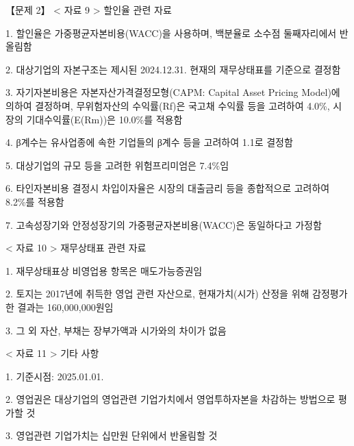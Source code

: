 \begin{longquestion}{【문제 2】}
< 자료 9 > 할인율 관련 자료 \par
1. 할인율은 가중평균자본비용(WACC)을 사용하며, 백분율로 소수점 둘째자리에서 반올림함 \par
2. 대상기업의 자본구조는 제시된 2024.12.31. 현재의 재무상태표를 기준으로 결정함 \par
3. 자기자본비용은 자본자산가격결정모형(CAPM: Capital Asset Pricing Model)에 의하여 결정하며, 무위험자산의 수익률(Rf)은 국고채 수익률 등을 고려하여 4.0\%, 시장의 기대수익률(E(Rm))은 10.0\%를 적용함 \par
4. β계수는 유사업종에 속한 기업들의 β계수 등을 고려하여 1.1로 결정함 \par
5. 대상기업의 규모 등을 고려한 위험프리미엄은 7.4\%임 \par
6. 타인자본비용 결정시 차입이자율은 시장의 대출금리 등을 종합적으로 고려하여 8.2\%를 적용함 \par
7. 고속성장기와 안정성장기의 가중평균자본비용(WACC)은 동일하다고 가정함 \par
< 자료 10 > 재무상태표 관련 자료 \par
1. 재무상태표상 비영업용 항목은 매도가능증권임 \par
2. 토지는 2017년에 취득한 영업 관련 자산으로, 현재가치(시가) 산정을 위해 감정평가한 결과는 160,000,000원임 \par
3. 그 외 자산, 부채는 장부가액과 시가와의 차이가 없음 \par
< 자료 11 > 기타 사항 \par
1. 기준시점: 2025.01.01. \par
2. 영업권은 대상기업의 영업관련 기업가치에서 영업투하자본을 차감하는 방법으로 평가할 것 \par
3. 영업관련 기업가치는 십만원 단위에서 반올림할 것 \par
\end{longquestion}
